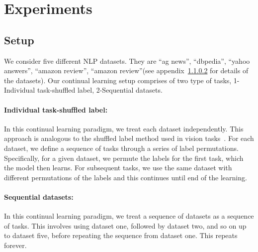 \section{Experiments}

\subsection{Setup}

We consider five different NLP datasets. They are ``ag news'', ``dbpedia'', ``yahoo answers'', ``amazon review'', ``amazon review''(see appendix~\ref{} for details of the datasets).  Our continual learning setup comprises of two type of tasks, 1-Individual task-shuffled label, 2-Sequential datasets.

\paragraph{Individual task-shuffled label:}
In this continual learning paradigm, we treat each dataset independently. This approach is analogous to the shuffled label method used in vision tasks~\cite{}. For each dataset, we define a sequence of tasks through a series of label permutations. Specifically, for a given dataset, we permute the labels for the first task, which the model then learns. For subsequent tasks, we use the same dataset with different permutations of the labels and this continues until end of the learning. 


\paragraph{Sequential datasets:}
In this continual learning paradigm, we treat a sequence of datasets as a sequence of tasks. This involves using dataset one, followed by dataset two, and so on up to dataset five, before repeating the sequence from dataset one. This repeats forever.

